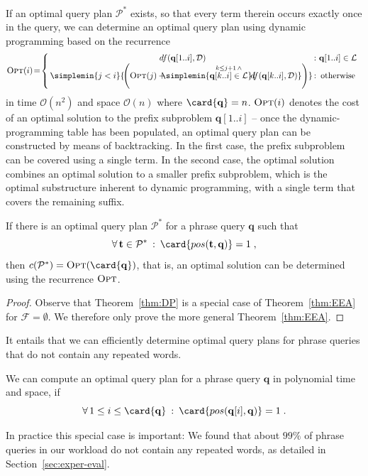 If an optimal query plan $\mathcal{P}^*$ exists, so that every term
therein occurs exactly once in the query, we can determine an optimal
query plan using dynamic programming based on the recurrence
\begin{equation*}
\textsc{Opt}(i) \!=\!
\left\{\begin{array}{c@{\,:\,\,}c}
 df(\mathbf{q}[1..i], \mathcal{D}) & \mathbf{q}[1..i] \in \mathcal{L}\\
 \!\!\simplemin{j<i}{\!\left(\textsc{Opt}(j) + \!\!\!\!\simplemin{\stackrel{k \le j+1 \, \wedge}{\mathbf{q}[k..i] \in \mathcal{L}}}{\!\!\!\!df(\mathbf{q}[k..i], \mathcal{D})} \right)} & \mbox{otherwise}
 \end{array}\right.
\end{equation*}
in time $\mathcal{O}(n^2)$ and space $\mathcal{O}(n)$ where
$\card{\mathbf{q}} = n$. $\textsc{Opt}(i)$ denotes the cost of an
optimal solution to the prefix subproblem $\mathbf{q}[1..i]$ -- once
the dynamic-programming table has been populated, an optimal query
plan can be constructed by means of backtracking. In the first case,
the prefix subproblem can be covered using a single term. In the
second case, the optimal solution combines an optimal solution to a
smaller prefix subproblem, which is the optimal substructure inherent
to dynamic programming, with a single term that covers the remaining
suffix.
\begin{theorem}{}
 \label{thm:DP} 
 If there is an optimal query plan $\mathcal{P}^*$ for a phrase query
 $\mathbf{q}$ such that
 $$
  \forall{\,\mathbf{t} \in \mathcal{P}^*} \::\: \card{pos(\mathbf{t}, \mathbf{q})} = 1\;,
 $$  
 then $c(\mathcal{P}^*) = \textsc{Opt}(\card{\mathbf{q}})$, that is,
 an optimal solution can be determined using the recurrence
 $\textsc{Opt}$.
\end{theorem}

\begin{proof}{}
  Observe that Theorem~\ref{thm:DP} is a special case of
  Theorem~\ref{thm:EEA} for $\mathcal{F}=\emptyset$. We therefore only
  prove the more general Theorem~\ref{thm:EEA}.
\end{proof}

 It entails that we can efficiently determine optimal query plans for phrase
queries that do not contain any repeated words.
\begin{corollary}{}
  \label{cor:NR}
  We can compute an optimal query plan for a phrase query $\mathbf{q}$
  in polynomial time and space, if 
  $$
  \forall{\,1 \le i \le \card{\mathbf{q}}} \::\: \card{pos(\mathbf{q}[i], \mathbf{q})} = 1 \;.
  $$
\end{corollary}
In practice this special case is important: We found that about $99\%$
of phrase queries in our workload do not contain any repeated words,
as detailed in Section~\ref{sec:exper-eval}.

